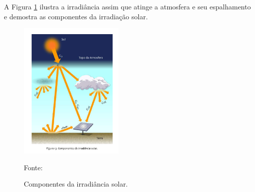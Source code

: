 A Figura \ref{fig:irradiacao_coceito} ilustra a irradiância assim que atinge a atmosfera e seu espalhamento e demostra as componentes da irradiação solar.

\begin{figure}[ht]
    \centering
    \includegraphics[width=0.45\textwidth]{./Figuras/irradiacao_coceito.png}
    \caption{Componentes da irradiância solar.}{Fonte: \cite{atlas2017}}
   \label{fig:irradiacao_coceito}
\end{figure}